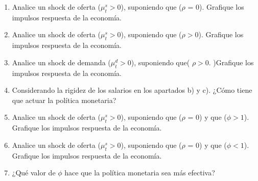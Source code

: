 \documentclass[a4paper,12pt]{article}
\begin{document}
\begin{enumerate}
\begin{enumerate}
 \item Analice un shock de oferta ($\mu_t^s > 0$), suponiendo que ($\rho$ = 0). Grafique los impulsos
respuesta de la economía.
\item Analice un shock de oferta ($\mu_t^s
> 0$), suponiendo que ($\rho > 0$). Grafique los impulsos
respuesta de la economía.
\item  Analice un shock de demanda ($\mu_t^d
> 0$), suponiendo que( $\rho > 0. $ )Grafique los impulsos
respuesta de la economía.
\item Considerando la rigidez de los salarios en los apartados b) y c). ¿Cómo tiene que actuar la política monetaria?
 \item Analice un shock de oferta ($\mu_t^s > 0$), suponiendo que ($\rho$ = 0) y que ($\phi>1$). Grafique los impulsos
respuesta de la economía.
 \item Analice un shock de oferta ($\mu_t^s > 0$), suponiendo que ($\rho$ = 0) y que ($\phi<1$). Grafique los impulsos
respuesta de la economía.
\item ¿Qué valor de $\phi$ hace que la política monetaria sea más efectiva?
\end{enumerate}



\end{enumerate}
\end{document}
